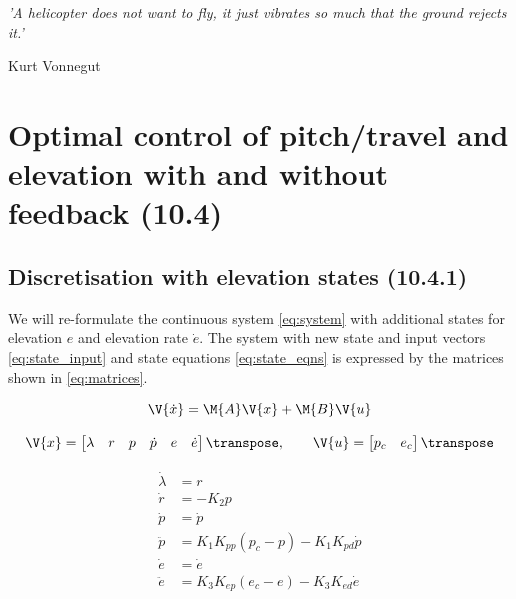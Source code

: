 \epigraph{\textit{'A helicopter does not want to fly, it just vibrates so much that the ground rejects it.'}}{Kurt Vonnegut}

\section{Optimal control of pitch/travel and elevation with and without feedback (10.4)}

\subsection{Discretisation with elevation states (10.4.1)} \label{10.4.1}
We will re-formulate the continuous system \eqref{eq:system} with additional states for elevation $e$ and elevation rate $\dot{e}$. The system with new state and input vectors \eqref{eq:state_input} and state equations \eqref{eq:state_eqns} is expressed by the matrices shown in \eqref{eq:matrices}.

\begin{equation}\label{eq:system}
	\V{\dot{x}}	= \M{A} \V{x} + \M{B} \V{u}
\end{equation}

\begin{equation}\label{eq:state_input}
	\V{x} =
	\begin{bmatrix}
		\lambda & r & p & \dot{p} & e & \dot{e}
	\end{bmatrix}\transpose
	,\qquad
	\V{u} =
	\begin{bmatrix}
		p_{c} & e_{c}
	\end{bmatrix}\transpose
\end{equation}

\begin{equation}\label{eq:state_eqns}
\begin{aligned}
	\dot{\lambda}	&= r \\
	\dot{r} 		&= - K_{2} p \\
	\dot{p}			&= \dot{p} \\
	\ddot{p}		&= K_{1} K_{pp} (p_{c} - p) - K_{1} K_{pd} \dot{p} \\
	\dot{e}			&= \dot{e} \\
	\ddot{e}		&= K_{3} K_{ep} (e_{c} - e) - K_{3} K_{ed} \dot{e}
\end{aligned}
\end{equation}

